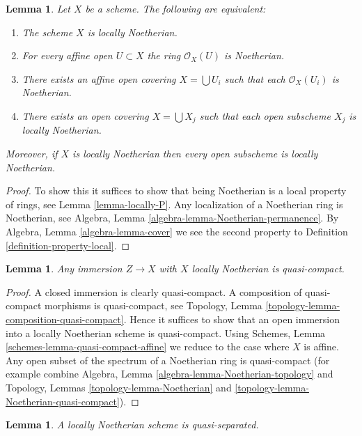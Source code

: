 \documentclass{stacks-project}
\theoremstyle{plain}
\newtheorem{lemma}[subsection]{Lemma}
\theoremstyle{definition}
\theoremstyle{remark}
\numberwithin{equation}{subsection}
\begin{document}
\begin{lemma}
\label{lemma-locally-Noetherian}
Let $X$ be a scheme. The following are equivalent:
\begin{enumerate}
\item The scheme $X$ is locally Noetherian.
\item For every affine open $U \subset X$ the ring $\mathcal{O}_X(U)$
is Noetherian.
\item There exists an affine open covering $X = \bigcup U_i$ such that
each $\mathcal{O}_X(U_i)$ is Noetherian.
\item There exists an open covering $X = \bigcup X_j$
such that each open subscheme $X_j$ is locally Noetherian.
\end{enumerate}
Moreover, if $X$ is locally Noetherian then every open subscheme
is locally Noetherian.
\end{lemma}

\begin{proof}
To show this it suffices to show that being Noetherian is a local
property of rings, see Lemma \ref{lemma-locally-P}.
Any localization of a Noetherian ring is Noetherian, see
Algebra, Lemma \ref{algebra-lemma-Noetherian-permanence}.
By Algebra, Lemma \ref{algebra-lemma-cover} we see the second
property to Definition \ref{definition-property-local}.
\end{proof}

\begin{lemma}
\label{lemma-immersion-into-noetherian}
Any immersion $Z \to X$ with $X$ locally Noetherian is quasi-compact.
\end{lemma}

\begin{proof}
A closed immersion is clearly quasi-compact.
A composition of quasi-compact morphisms is quasi-compact,
see Topology, Lemma \ref{topology-lemma-composition-quasi-compact}.
Hence it suffices to show that an open immersion into
a locally Noetherian scheme is quasi-compact.
Using Schemes, Lemma \ref{schemes-lemma-quasi-compact-affine}
we reduce to the case where $X$ is affine.
Any open subset of the spectrum of a Noetherian ring
is quasi-compact (for example
combine Algebra, Lemma \ref{algebra-lemma-Noetherian-topology} and
Topology, Lemmas \ref{topology-lemma-Noetherian} and
\ref{topology-lemma-Noetherian-quasi-compact}).
\end{proof}

\begin{lemma}
\label{lemma-locally-Noetherian-quasi-separated}
A locally Noetherian scheme is quasi-separated.
\end{lemma}
\end{document}
